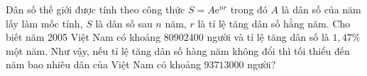 \begin{ex}%
	Dân số thế giới được tính  theo công thức $S=A\mathrm{e}^{nr}$ trong đó $A$ là dân số của năm lấy làm mốc tính, $S$ là dân số sau $n$ năm, $r$ là tỉ lệ tăng dân số hằng năm. Cho biết năm 2005 Việt Nam có khoảng $80902400$ người và tỉ lệ tăng dân số là $1,47\%$ một năm. Như vậy, nếu tỉ lệ tăng dân số hàng năm không đổi thì tối thiểu đến năm bao nhiêu dân của Việt Nam có khoảng $93713000$ người?
\end{ex}

